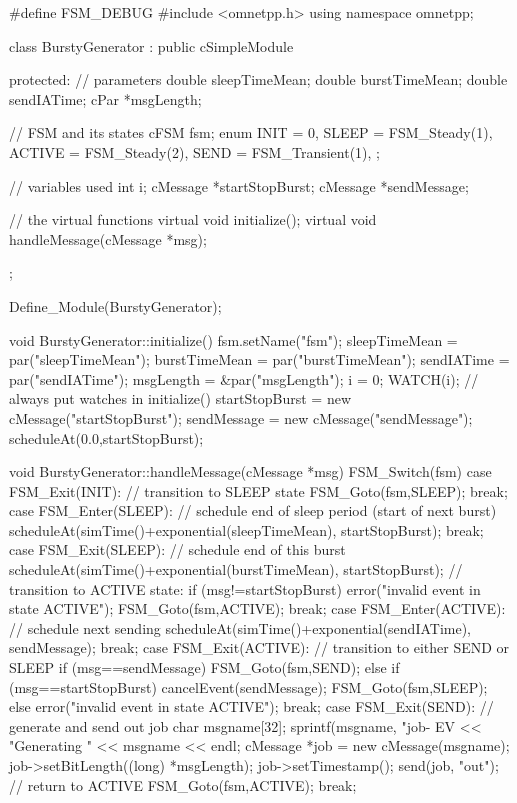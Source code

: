\begin{cpp}
#define FSM_DEBUG
#include <omnetpp.h>
using namespace omnetpp;

class BurstyGenerator : public cSimpleModule
{
  protected:
    // parameters
    double sleepTimeMean;
    double burstTimeMean;
    double sendIATime;
    cPar *msgLength;

    // FSM and its states
    cFSM fsm;
    enum {
      INIT = 0,
      SLEEP = FSM_Steady(1),
      ACTIVE = FSM_Steady(2),
      SEND = FSM_Transient(1),
    };

    // variables used
    int i;
    cMessage *startStopBurst;
    cMessage *sendMessage;

    // the virtual functions
    virtual void initialize();
    virtual void handleMessage(cMessage *msg);
};

Define_Module(BurstyGenerator);

void BurstyGenerator::initialize()
{
    fsm.setName("fsm");
    sleepTimeMean = par("sleepTimeMean");
    burstTimeMean = par("burstTimeMean");
    sendIATime = par("sendIATime");
    msgLength = &par("msgLength");
    i = 0;
    WATCH(i); // always put watches in initialize()
    startStopBurst = new cMessage("startStopBurst");
    sendMessage = new cMessage("sendMessage");
    scheduleAt(0.0,startStopBurst);
}

void BurstyGenerator::handleMessage(cMessage *msg)
{
   FSM_Switch(fsm) {
     case FSM_Exit(INIT):
       // transition to SLEEP state
       FSM_Goto(fsm,SLEEP);
       break;
     case FSM_Enter(SLEEP):
       // schedule end of sleep period (start of next burst)
       scheduleAt(simTime()+exponential(sleepTimeMean), startStopBurst);
     break;
     case FSM_Exit(SLEEP):
       // schedule end of this burst
       scheduleAt(simTime()+exponential(burstTimeMean), startStopBurst);
       // transition to ACTIVE state:
       if (msg!=startStopBurst) {
         error("invalid event in state ACTIVE");
       }
       FSM_Goto(fsm,ACTIVE);
       break;
     case FSM_Enter(ACTIVE):
       // schedule next sending
       scheduleAt(simTime()+exponential(sendIATime), sendMessage);
     break;
     case FSM_Exit(ACTIVE):
       // transition to either SEND or SLEEP
       if (msg==sendMessage) {
         FSM_Goto(fsm,SEND);
       } else if (msg==startStopBurst) {
         cancelEvent(sendMessage);
         FSM_Goto(fsm,SLEEP);
       } else {
         error("invalid event in state ACTIVE");
       }
       break;
     case FSM_Exit(SEND): {
       // generate and send out job
       char msgname[32];
       sprintf(msgname, "job-%
       EV << "Generating " << msgname << endl;
       cMessage *job = new cMessage(msgname);
       job->setBitLength((long) *msgLength);
       job->setTimestamp();
       send(job, "out");
       // return to ACTIVE
       FSM_Goto(fsm,ACTIVE);
       break;
     }
   }
}
\end{cpp}




